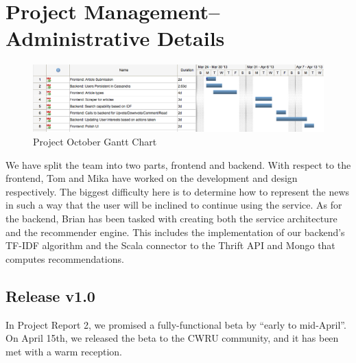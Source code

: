 \documentclass[11pt,letterpaper]{article}
\begin{document}
\section{Project Management--Administrative Details}

\begin{figure}
\centering
\includegraphics[scale=0.45]{img/octoborg-gantt.png}
\caption{Project October Gantt Chart}
\label{fig:gantt}
\end{figure}

We have split the team into two parts, frontend and backend.
With respect to the frontend, Tom and Mika have worked on the development and design respectively.
The biggest difficulty here is to determine how to represent the news in such a way that the user will be inclined to continue using the service.
As for the backend, Brian has been tasked with creating both the service architecture and the recommender engine.
This includes the implementation of our backend's TF-IDF algorithm and the Scala connector to the Thrift API and Mongo that computes recommendations.

\subsection{Release v1.0}
\label{sec:release1.0}
In Project Report 2, we promised a fully-functional beta by ``early to mid-April''.
On April 15th, we released the beta to the CWRU community, and it has been met with a warm reception.
\end{document}
